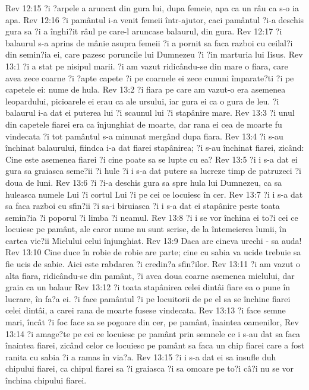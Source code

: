 Rev 12:15  ?i ?arpele a aruncat din gura lui, dupa femeie, apa ca un râu ca s-o ia apa.
Rev 12:16  ?i pamântul i-a venit femeii într-ajutor, caci pamântul ?i-a deschis gura sa ?i a înghi?it râul pe care-l aruncase balaurul, din gura.
Rev 12:17  ?i balaurul s-a aprins de mânie asupra femeii ?i a pornit sa faca razboi cu ceilal?i din semin?ia ei, care pazesc poruncile lui Dumnezeu ?i ?in marturia lui Iisus.
Rev 13:1  ?i a stat pe nisipul marii. ?i am vazut ridicându-se din mare o fiara, care avea zece coarne ?i ?apte capete ?i pe coarnele ei zece cununi împarate?ti ?i pe capetele ei: nume de hula.
Rev 13:2  ?i fiara pe care am vazut-o era asemenea leopardului, picioarele ei erau ca ale ursului, iar gura ei ca o gura de leu. ?i balaurul i-a dat ei puterea lui ?i scaunul lui ?i stapânire mare.
Rev 13:3  ?i unul din capetele fiarei era ca înjunghiat de moarte, dar rana ei cea de moarte fu vindecata ?i tot pamântul s-a minunat mergând dupa fiara.
Rev 13:4  ?i s-au închinat balaurului, fiindca i-a dat fiarei stapânirea; ?i s-au închinat fiarei, zicând: Cine este asemenea fiarei ?i cine poate sa se lupte cu ea?
Rev 13:5  ?i i s-a dat ei gura sa graiasca seme?ii ?i hule ?i i s-a dat putere sa lucreze timp de patruzeci ?i doua de luni.
Rev 13:6  ?i ?i-a deschis gura sa spre hula lui Dumnezeu, ca sa huleasca numele Lui ?i cortul Lui ?i pe cei ce locuiesc în cer.
Rev 13:7  ?i i s-a dat sa faca razboi cu sfin?ii ?i sa-i biruiasca ?i i s-a dat ei stapânire peste toata semin?ia ?i poporul ?i limba ?i neamul.
Rev 13:8  ?i i se vor închina ei to?i cei ce locuiesc pe pamânt, ale caror nume nu sunt scrise, de la întemeierea lumii, în cartea vie?ii Mielului celui înjunghiat.
Rev 13:9  Daca are cineva urechi - sa auda!
Rev 13:10  Cine duce în robie de robie are parte; cine cu sabia va ucide trebuie sa fie ucis de sabie. Aici este rabdarea ?i credin?a sfin?ilor.
Rev 13:11  ?i am vazut o alta fiara, ridicându-se din pamânt, ?i avea doua coarne asemenea mielului, dar graia ca un balaur
Rev 13:12  ?i toata stapânirea celei dintâi fiare ea o pune în lucrare, în fa?a ei. ?i face pamântul ?i pe locuitorii de pe el sa se închine fiarei celei dintâi, a carei rana de moarte fusese vindecata.
Rev 13:13  ?i face semne mari, încât ?i foc face sa se pogoare din cer, pe pamânt, înaintea oamenilor,
Rev 13:14  ?i amage?te pe cei ce locuiesc pe pamânt prin semnele ce i s-au dat sa faca înaintea fiarei, zicând celor ce locuiesc pe pamânt sa faca un chip fiarei care a fost ranita cu sabia ?i a ramas în via?a.
Rev 13:15  ?i i s-a dat ei sa insufle duh chipului fiarei, ca chipul fiarei sa ?i graiasca ?i sa omoare pe to?i câ?i nu se vor închina chipului fiarei.
